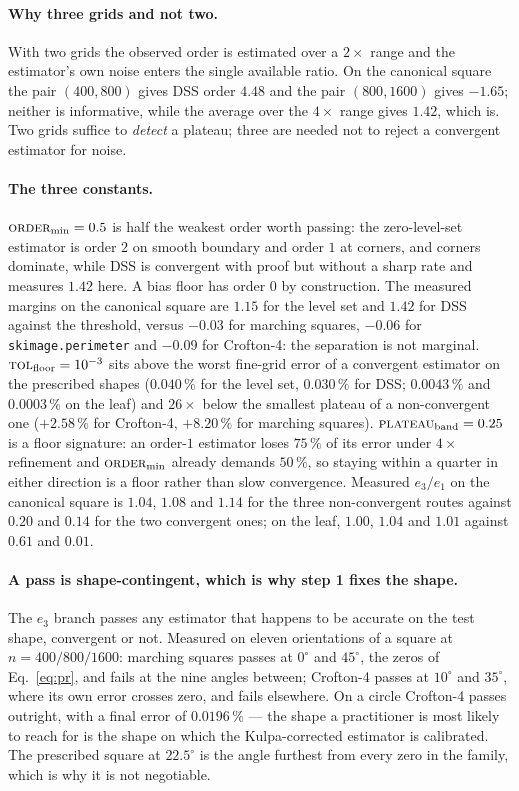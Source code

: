 \documentclass{article}
\newcommand{\pct}[1]{$#1\,\%$}
\begin{document}
\paragraph{Why three grids and not two.} With two grids the observed order is estimated over a
$2\times$ range and the estimator's own noise enters the single available ratio. On the canonical
square the pair $(400,800)$ gives DSS order $4.48$ and the pair $(800,1600)$ gives $-1.65$; neither
is informative, while the average over the $4\times$ range gives $1.42$, which is. Two grids suffice
to \emph{detect} a plateau; three are needed not to reject a convergent estimator for noise.

\paragraph{The three constants.} $\textsc{order}_{\min} = 0.5$ is half the weakest order worth
passing: the zero-level-set estimator is order $2$ on smooth boundary and order $1$ at corners, and
corners dominate, while DSS is convergent with proof but without a sharp rate and measures $1.42$
here. A bias floor has order $0$ by construction. The measured margins on the canonical square are
$1.15$ for the level set and $1.42$ for DSS against the threshold, versus $-0.03$ for marching
squares, $-0.06$ for \texttt{skimage.perimeter} and $-0.09$ for Crofton-4: the separation is not
marginal. $\textsc{tol}_{\text{floor}} = 10^{-3}$ sits above the worst fine-grid error of a
convergent estimator on the prescribed shapes ($0.040\,\%$ for the level set, $0.030\,\%$ for DSS;
$0.0043\,\%$ and $0.0003\,\%$ on the leaf) and $26\times$ below the smallest plateau of a
non-convergent one ($+2.58\,\%$ for Crofton-4, $+8.20\,\%$ for marching squares).
$\textsc{plateau}_{\text{band}} = 0.25$ is a floor signature: an order-$1$ estimator loses \pct{75}
of its error under $4\times$ refinement and $\textsc{order}_{\min}$ already demands \pct{50}, so
staying within a quarter in either direction is a floor rather than slow convergence. Measured
$e_3/e_1$ on the canonical square is $1.04$, $1.08$ and $1.14$ for the three non-convergent routes
against $0.20$ and $0.14$ for the two convergent ones; on the leaf, $1.00$, $1.04$ and $1.01$
against $0.61$ and $0.01$.

\paragraph{A pass is shape-contingent, which is why step 1 fixes the shape.} The $e_3$ branch
passes any estimator that happens to be accurate on the test shape, convergent or not. Measured on
eleven orientations of a square at $n = 400/800/1600$: marching squares passes at $0^\circ$ and
$45^\circ$, the zeros of Eq.~\eqref{eq:pr}, and fails at the nine angles between; Crofton-4 passes
at $10^\circ$ and $35^\circ$, where its own error crosses zero, and fails elsewhere. On a circle
Crofton-4 passes outright, with a final error of $0.0196\,\%$ --- the shape a practitioner is most
likely to reach for is the shape on which the Kulpa-corrected estimator is calibrated. The
prescribed square at $22.5^\circ$ is the angle furthest from every zero in the family, which is why
it is not negotiable.
\end{document}
